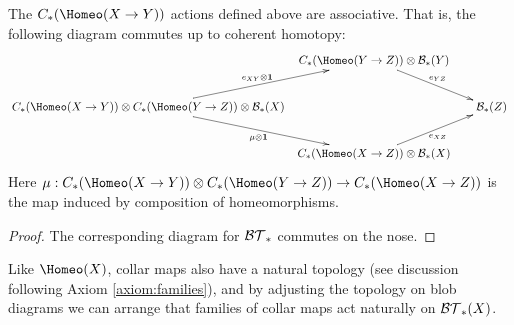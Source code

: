 \begin{thm}
\label{thm:CH-associativity}
The $\CH{X \to Y}$ actions defined above are associative.
That is, the following diagram commutes up to coherent homotopy:
\[ \xymatrix@C=5pt{
& \CH{Y\to Z} \ot \bc_*(Y) \ar[drr]^{e_{YZ}} & &\\
\CH{X \to Y} \ot \CH{Y \to Z} \ot \bc_*(X) \ar[ur]^{e_{XY}\ot\id} \ar[dr]_{\mu\ot\id} & & & \bc_*(Z) \\
& \CH{X \to Z} \ot \bc_*(X) \ar[urr]_{e_{XZ}} & &
} \]
Here $\mu:\CH{X\to Y} \ot \CH{Y \to Z}\to \CH{X \to Z}$ is the map induced by composition
of homeomorphisms.
\end{thm}
\begin{proof}
The corresponding diagram for ${\mathcal{BT}}_*$ commutes on the nose.
\end{proof}


\begin{remark} \label{collar-map-action-remark} \rm
Like $\Homeo(X)$, collar maps also have a natural topology (see discussion following Axiom \ref{axiom:families}),
and by adjusting the topology on blob diagrams we can arrange that families of collar maps
act naturally on ${\mathcal{BT}}_*(X)$.
\end{remark}


